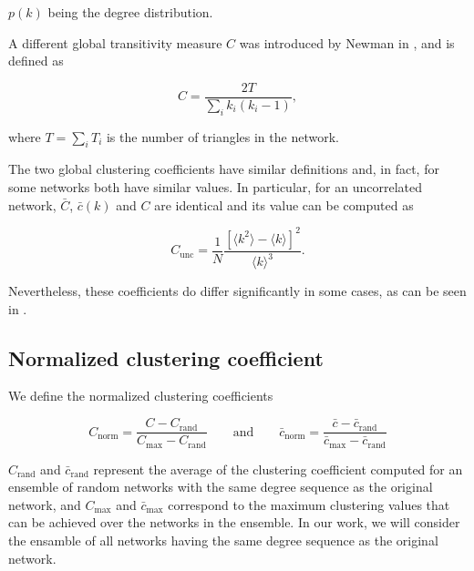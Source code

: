 \documentclass{article}
\begin{document}
$p(k)$ being the degree distribution.

A different global transitivity measure $C$ was introduced by Newman in \cite{Newman2003}, and is defined as 

\begin{equation}
    C = \dfrac{2T}{\sum_i k_i (k_i-1)},
\end{equation}

where $T = \sum_i T_i$ is the number of triangles in the network.

The two global clustering coefficients have similar definitions and, in fact, for some networks both have similar values. In particular, for an uncorrelated network, $\bar{C}$, $\bar{c}(k)$ and $C$ are identical and its value can be computed as \cite{NewmanBook} 

\begin{equation} \label{eq:Cunc}
C_{\mathrm{unc}} = \dfrac{1}{N} \dfrac{\left[ \langle k^2 \rangle - \langle k \rangle  \right]^2}{\langle k \rangle^3}.
\end{equation}

Nevertheless, these coefficients do differ significantly in some cases, as can be seen in \cite{Bollobs2004, Estrada2011}.

\subsection{Normalized clustering coefficient}

We define the normalized clustering coefficients

\begin{equation} \label{eq:Cnorm}
C_{\mathrm{norm}} = \dfrac{C - C_{\mathrm{rand}}}{C_{\mathrm{max}} - C_{\mathrm{rand}}}\qquad \text{and} \qquad
\bar{c}_{\mathrm{norm}} = \dfrac{\bar{c} - \bar{c}_{\mathrm{rand}}}{\bar{c}_{\mathrm{max}} - \bar{c}_{\mathrm{rand}}}
\end{equation}

$C_{\mathrm{rand}}$ and $\bar{c}_{\mathrm{rand}}$ represent the average of the clustering coefficient computed for an ensemble of random networks with the same degree sequence as the original network, and $C_{\mathrm{max}}$ and $\bar{c}_{\mathrm{max}}$ correspond to the maximum clustering values that can be achieved over the networks in the ensemble. In our work, we will consider the ensamble of all networks having the same degree sequence as the original network.
\end{document}
